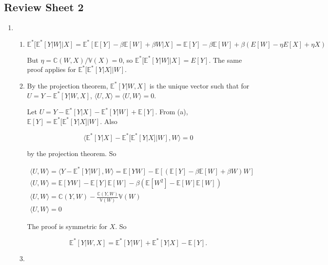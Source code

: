 \documentclass{article}
\begin{document}
\subsection*{Review Sheet 2}

\begin{enumerate}

	\item

	\begin{enumerate}

		\item

		$$\mathbb{E}^*[\mathbb{E}^*[Y|W]|X] = \mathbb{E}^*[\mathbb{E}[Y] - \beta \mathbb{E}[W] + \beta W | X] = \mathbb{E}[Y] - \beta \mathbb{E}[W] + \beta (E[W] - \eta E[X] + \eta X)$$

		But $\eta = \mathbb{C}(W,X)/\mathbb{V}(X) = 0$, so $\mathbb{E}^*[\mathbb{E}^*[Y|W]|X]  = E[Y]$. The same proof applies for  $\mathbb{E}^*[\mathbb{E}^*[Y|X]|W]$.

		\item

		By the projection theorem, $\mathbb{E}^*[Y|W,X]$ is the unique vector such that for $U = Y - \mathbb{E}^*[Y|W,X]$, $\langle U,X \rangle = \langle U,W \rangle = 0$.

		Let $U = Y - \mathbb{E}^*[Y|X] - \mathbb{E}^*[Y|W] + \mathbb{E}[Y]$. From (a), $\mathbb{E}[Y] = \mathbb{E}^*[\mathbb{E}^*[Y|X]|W]$. Also

		$$\langle \mathbb{E}^*[Y|X] - \mathbb{E}^*[\mathbb{E}^*[Y|X]|W], W \rangle = 0$$

		by the projection theorem. So

		\begin{gather*}
		\langle U, W \rangle = \langle Y - \mathbb{E}^*[Y|W], W \rangle = \mathbb{E}[YW] - \mathbb{E}[(\mathbb{E}[Y] - \beta \mathbb{E}[W] + \beta W)W] \\
		\langle U, W \rangle = \mathbb{E}[YW] - \mathbb{E}[Y]\mathbb{E}[W] - \beta(\mathbb{E}[W^2] - \mathbb{E}[W]\mathbb{E}[W]) \\
		\langle U, W \rangle = \mathbb{C}(Y,W) - \frac{\mathbb{C}(Y,W)}{\mathbb{V}(W)}\mathbb{V}(W) \\
		\langle U, W \rangle = 0
		\end{gather*}

		The proof is symmetric for $X$. So 

		$$\mathbb{E}^*[Y|W,X] = \mathbb{E}^*[Y|W] + \mathbb{E}^*[Y|X] - \mathbb{E}[Y].$$

		\item


\end{enumerate}
\end{enumerate}
\end{document}
